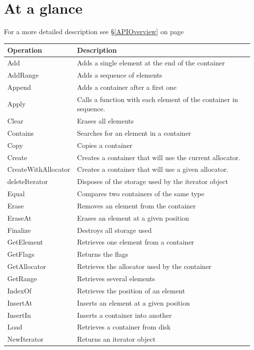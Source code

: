 \documentclass[12pt,a4paper]{memoir} %
\newcommand{\See}[1]{%
see \S\ref{#1} on page~\pageref{#1}
}
\begin{document}
\section{At a glance}
For a more detailed description \See{APIOverview}
{\footnotesize
\begin{longtable}{|p{3.5cm}|p{10.5cm}|}
\hline
\textbf{Operation}&\textbf{Description}\\\hline 
Add&Adds a single element at the end of the container\\\hline
AddRange&Adds a sequence of elements\\\hline
Append&Adds a container after a first one \\\hline
Apply&Calls a function with each element of the container in  sequence.\\\hline
Clear&Erases all elements \\\hline
Contains&Searches for an element in a container\\\hline
Copy&Copies a container \\\hline
Create&Creates a container that will use the current allocator.\\\hline
CreateWithAllocator&Creates a container that will use a given allocator.\\\hline
deleteIterator&Disposes of the storage used by the iterator object \\\hline
Equal&Compares two containers of the same type \\\hline
Erase&Removes an element from the container\\\hline
EraseAt&Erases an element at a given position \\\hline
Finalize&Destroys all storage used \\\hline 
GetElement&Retrieves one element from a container \\\hline
GetFlags&Returns the flags\\\hline
GetAllocator&Retrieves the allocator used by the container\\\hline
GetRange&Retrieves several elements\\\hline
IndexOf&Retrieves the position of an element \\\hline
InsertAt&Inserts an element at a given position \\\hline
InsertIn&Inserts a container into another \\\hline
Load&Retrieves a container from disk \\\hline
NewIterator&Returns an iterator object \\\hline

\end{longtable}}
\end{document}

